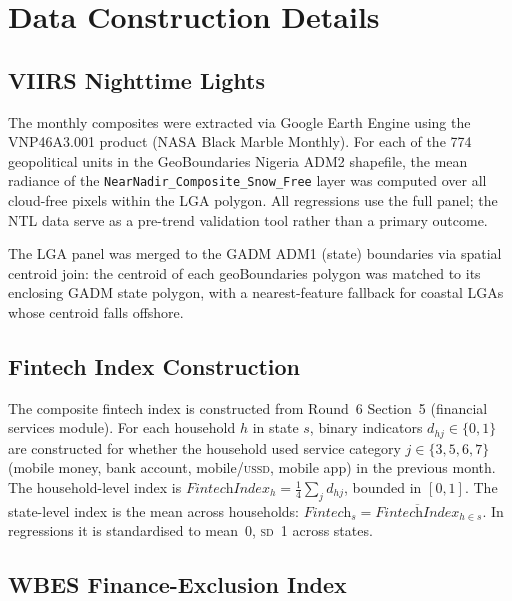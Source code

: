 
\section{Data Construction Details}
\label{asec:data_construction}

\subsection{VIIRS Nighttime Lights}
\label{asec:viirs_construction}

The monthly \VIIRS{} composites were extracted via Google Earth Engine
using the VNP46A3.001 product (NASA Black Marble Monthly). For each
of the 774 geopolitical units in the GeoBoundaries Nigeria ADM2
shapefile, the mean radiance of the \texttt{NearNadir\_Composite\_Snow\_Free}
layer was computed over all cloud-free pixels within the LGA polygon.
All regressions use the full panel; the NTL data serve as a pre-trend
validation tool rather than a primary outcome.

The LGA panel was merged to the GADM ADM1 (state) boundaries via
spatial centroid join: the centroid of each geoBoundaries polygon
was matched to its enclosing GADM state polygon, with a nearest-feature
fallback for coastal LGAs whose centroid falls offshore.

\subsection{Fintech Index Construction}
\label{asec:fintech_construction}

The composite fintech index is constructed from \NLPS{} Round~6
Section~5 (financial services module). For each household $h$ in
state $s$, binary indicators $d_{hj} \in \{0,1\}$ are constructed
for whether the household used service category $j \in \{3,5,6,7\}$
(mobile money, bank account, mobile/\textsc{ussd}, mobile app)
in the previous month. The household-level index is
$\textit{FintechIndex}_h = \frac{1}{4}\sum_{j} d_{hj}$, bounded in
$[0,1]$. The state-level index is the mean across households:
$\textit{Fintech}_s = \overline{\textit{FintechIndex}}_{h \in s}$.
In regressions it is standardised to mean~0, \textsc{sd}~1 across
states.

\subsection{WBES Finance-Exclusion Index}
\label{asec:wbes_construction}

